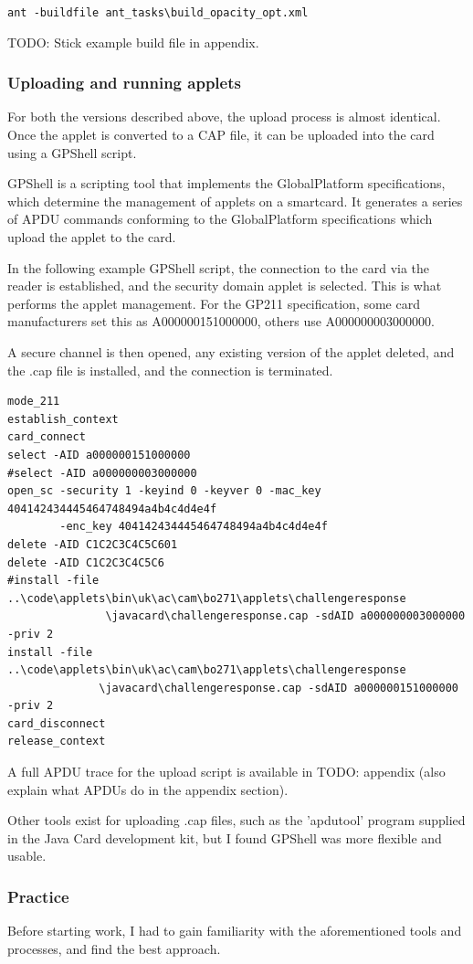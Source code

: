 \documentclass[12pt]{article}
\begin{document}
\verb|ant -buildfile ant_tasks\build_opacity_opt.xml|

TODO: Stick example build file in appendix.

\subsubsection{Uploading and running applets}
For both the versions described above, the upload process is almost identical. Once the applet is converted to a CAP file, it can be uploaded into the card using a GPShell script.

GPShell is a scripting tool that implements the GlobalPlatform specifications, which determine the management of applets on a smartcard. It generates a series of APDU commands conforming to the GlobalPlatform specifications which upload the applet to the card.

In the following example GPShell script, the connection to the card via the reader is established, and the security domain applet is selected. This is what performs the applet management. For the GP211 specification, some card manufacturers set this as A000000151000000, others use A000000003000000.

A secure channel is then opened, any existing version of the applet deleted, and the .cap file is installed, and the connection is terminated.
\begin{verbatim}
mode_211
establish_context
card_connect
select -AID a000000151000000
#select -AID a000000003000000
open_sc -security 1 -keyind 0 -keyver 0 -mac_key 404142434445464748494a4b4c4d4e4f 
        -enc_key 404142434445464748494a4b4c4d4e4f
delete -AID C1C2C3C4C5C601
delete -AID C1C2C3C4C5C6
#install -file ..\code\applets\bin\uk\ac\cam\bo271\applets\challengeresponse
               \javacard\challengeresponse.cap -sdAID a000000003000000 -priv 2
install -file ..\code\applets\bin\uk\ac\cam\bo271\applets\challengeresponse
              \javacard\challengeresponse.cap -sdAID a000000151000000 -priv 2
card_disconnect
release_context
\end{verbatim}

A full APDU trace for the upload script is available in TODO: appendix (also explain what APDUs do in the appendix section).

Other tools exist for uploading .cap files, such as the 'apdutool' program supplied in the Java Card development kit, but I found GPShell was more flexible and usable.

\subsubsection{Practice}
Before starting work, I had to gain familiarity with the aforementioned tools and processes, and find the best approach.
\end{document}
